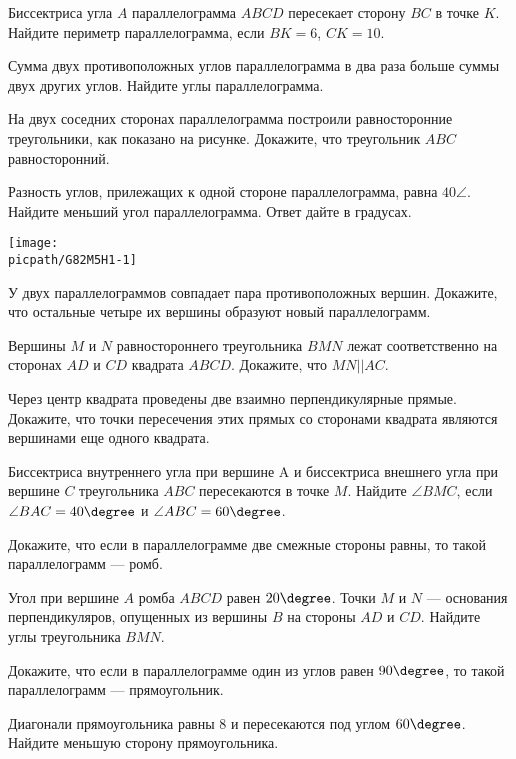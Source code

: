 \begin{class}[number=4]
	\begin{listofex}
		\item Биссектриса угла \( A \) параллелограмма \( ABCD \) пересекает сторону \( BC \) в точке \( K \). Найдите периметр параллелограмма, если \( BK  =  6 \), \( CK  =  10 \).
		\item Сумма двух противоположных углов параллелограмма в два раза больше суммы двух других углов. Найдите углы параллелограмма.
		\item На двух соседних сторонах параллелограмма построили равносторонние треугольники, как показано на рисунке. Докажите, что треугольник \( ABC \) равносторонний.
		\item Разность углов, прилежащих к одной стороне параллелограмма, равна \( 40\angle \). Найдите меньший угол параллелограмма. Ответ дайте в градусах.
		\begin{center}
			\texttt{[image: \\picpath/G82M5H1-1]}
		\end{center}
		\item У двух параллелограммов совпадает пара противоположных вершин. Докажите, что остальные четыре их вершины образуют новый параллелограмм.
		\item Вершины \( M \) и \( N \) равностороннего треугольника \( BMN \)
		лежат соответственно на сторонах \( AD \) и \( CD \) квадрата \( ABCD \).
		Докажите, что \( MN || AC \).
		\item Через центр квадрата проведены две взаимно
		перпендикулярные прямые. Докажите, что точки пересечения этих
		прямых со сторонами квадрата являются вершинами еще одного
		квадрата.
	\end{listofex}
\end{class}

\begin{homework}[number=1]
	\begin{listofex}
		\item Биссектриса внутреннего угла при вершине A и биссектриса внешнего угла при вершине \( C \) треугольника \( ABC \)
		пересекаются в точке \( M \). Найдите \( \angle BMC \), если \( \angle BAC = 40\degree \) и \( \angle ABC = 60\degree \).
		\item Докажите, что если в параллелограмме две смежные стороны равны, то такой параллелограмм --- ромб.
		\item Угол при вершине \( A \) ромба \( ABCD \) равен \( 20\degree \). Точки \( M \) и \( N \) --- основания перпендикуляров, опущенных из вершины \( B \) на стороны \( AD \) и \( CD \). Найдите углы треугольника \( BMN \).
		\item Докажите, что если в параллелограмме один из углов равен \( 90\degree \), то такой параллелограмм --- прямоугольник.
		\item Диагонали прямоугольника равны \( 8 \) и пересекаются под углом \( 60\degree \). Найдите меньшую сторону прямоугольника.
	\end{listofex}
\end{homework}

